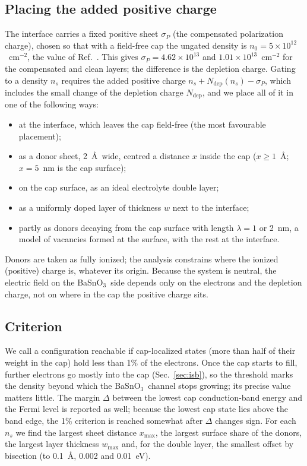 \documentclass[11pt]{article}
\newcommand{\BSO}{\texorpdfstring{BaSnO$_3$}{BaSnO3}}
\newcommand{\xmax}{x_\mathrm{max}}
\begin{document}
\subsection{Placing the added positive charge}
The interface carries a fixed positive sheet $\sigma_P$ (the compensated polarization charge), chosen so that with a field-free cap the ungated density is $n_0=5\times10^{12}$~cm$^{-2}$, the value of Ref.~\cite{Lee2024LIO}. This gives $\sigma_P=4.62\times10^{13}$ and $1.01\times10^{13}$~cm$^{-2}$ for the compensated and clean layers; the difference is the depletion charge. Gating to a density $n_s$ requires the added positive charge $n_s+N_\mathrm{dep}(n_s)-\sigma_P$, which includes the small change of the depletion charge $N_\mathrm{dep}$, and we place all of it in one of the following ways:
\begin{itemize}
\item at the interface, which leaves the cap field-free (the most favourable placement);
\item as a donor sheet, 2~\AA\ wide, centred a distance $x$ inside the cap ($x\ge1$~\AA; $x=5$~nm is the cap surface);
\item on the cap surface, as an ideal electrolyte double layer;
\item as a uniformly doped layer of thickness $w$ next to the interface;
\item partly as donors decaying from the cap surface with length $\lambda=1$ or 2~nm, a model of vacancies formed at the surface, with the rest at the interface.
\end{itemize}
Donors are taken as fully ionized; the analysis constrains where the ionized (positive) charge is, whatever its origin. Because the system is neutral, the electric field on the \BSO\ side depends only on the electrons and the depletion charge, not on where in the cap the positive charge sits.

\subsection{Criterion}
We call a configuration reachable if cap-localized states (more than half of their weight in the cap) hold less than 1\% of the electrons. Once the cap starts to fill, further electrons go mostly into the cap (Sec.~\ref{sec:isb}), so the threshold marks the density beyond which the \BSO\ channel stops growing; its precise value matters little. The margin $\Delta$ between the lowest cap conduction-band energy and the Fermi level is reported as well; because the lowest cap state lies above the band edge, the 1\% criterion is reached somewhat after $\Delta$ changes sign. For each $n_s$ we find the largest sheet distance $\xmax$, the largest surface share of the donors, the largest layer thickness $w_\mathrm{max}$ and, for the double layer, the smallest offset by bisection (to 0.1~\AA, 0.002 and 0.01~eV).
\end{document}
